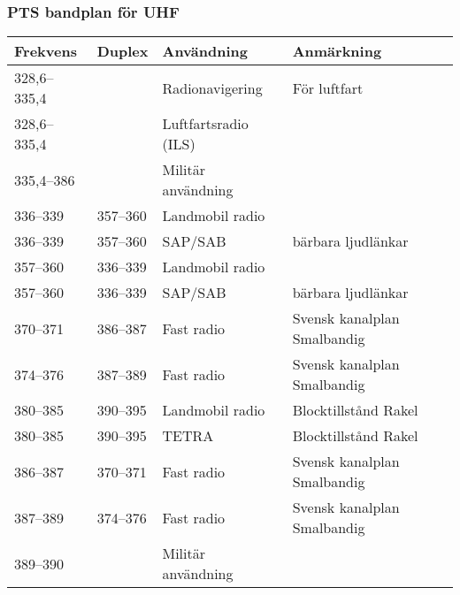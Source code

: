 \begin{landscape}


\begin{landscape}
\subsubsection{PTS bandplan för UHF}
\begin{longtable}{llll}
	\textbf{Frekvens}  & \textbf{Duplex}    & \textbf{Användning}     & \textbf{Anmärkning}                   \\ \hline
	\endhead
	328,6--335,4       &                    & Radionavigering         & För luftfart                          \\
	328,6--335,4       &                    & Luftfartsradio (ILS)    &                                       \\
	335,4--386         &                    & Militär användning      &                                       \\
	336--339           & 357--360           & Landmobil radio         &                                       \\
	336--339           & 357--360           & SAP/SAB                 & bärbara ljudlänkar                    \\
	357--360           & 336--339           & Landmobil radio         &                                       \\
	357--360           & 336--339           & SAP/SAB                 & bärbara ljudlänkar                    \\
	370--371           & 386--387           & Fast radio              & Svensk kanalplan Smalbandig           \\
	374--376           & 387--389           & Fast radio              & Svensk kanalplan Smalbandig           \\
	380--385           & 390--395           & Landmobil radio         & Blocktillstånd Rakel                  \\
	380--385           & 390--395           & TETRA                   & Blocktillstånd Rakel                  \\
	386--387           & 370--371           & Fast radio              & Svensk kanalplan Smalbandig           \\
	387--389           & 374--376           & Fast radio              & Svensk kanalplan Smalbandig           \\
	389--390           &                    & Militär användning      &                                       \\

\end{longtable}
\end{landscape}
\end{landscape}
